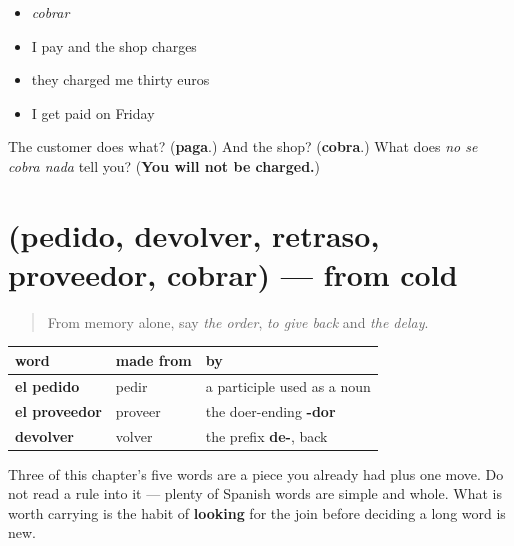 \begin{itemize}
\raggedright
  \item \emph{cobrar}
  \item I pay and the shop charges
  \item they charged me thirty euros
  \item I get paid on Friday
\end{itemize}

\begin{tcolorbox}[breakable,colback=teal!4,colframe=teal!35!black,title={Before you move on}]
The customer does what? (\textbf{paga}.) And the shop? (\textbf{cobra}.) What does \emph{no se cobra nada} tell you? (\textbf{You will not be charged.})
\end{tcolorbox}
\section[(pedido, devolver, retraso, proveedor …]{(pedido, devolver, retraso, proveedor, cobrar) — from cold}

\label{lesson:ES-R431-repaso-pedido}



\begin{quote}
From memory alone, say \emph{the order}, \emph{to give back} and \emph{the delay}.
\end{quote}

\begin{grammarlens}[title={Grammar Lens: three of the five were built, not learned}]
\noindent
\begin{tabularx}{\linewidth}{@{}>{\raggedright\arraybackslash}X>{\raggedright\arraybackslash}X>{\raggedright\arraybackslash}X@{}}
\toprule
\textbf{word} & \textbf{made from} & \textbf{by} \\
\midrule
\textbf{el pedido} & pedir & a participle used as a noun \\
\textbf{el proveedor} & proveer & the doer-ending \textbf{-dor} \\
\textbf{devolver} & volver & the prefix \textbf{de-}, back \\
\bottomrule
\end{tabularx}

Three of this chapter's five words are a piece you already had plus one move. Do not read a rule into it — plenty of Spanish words are simple and whole. What is worth carrying is the habit of \textbf{looking} for the join before deciding a long word is new.
\end{grammarlens}

